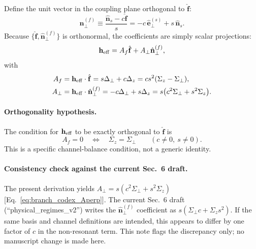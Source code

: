 Define the unit vector in the coupling plane orthogonal to $\hat{\mathbf f}$:
\begin{equation}
    \hat{\mathbf n}^{(f)}_\perp
    \equiv \frac{\hat{\mathbf n}_s - c\hat{\mathbf f}}{s}
    = -c\,\hat{\mathbf e}_{\perp}^{(s)} + s\,\hat{\mathbf n}_s.
\end{equation}
Because $\{\hat{\mathbf f},\hat{\mathbf n}^{(f)}_\perp\}$ is orthonormal, the
coefficients are simply scalar projections:
\begin{equation}
    \mathbf h_{\rm eff} = A_f \hat{\mathbf f} + A_\perp \hat{\mathbf n}^{(f)}_\perp,
\end{equation}
with
\begin{align}
    A_f &= \mathbf h_{\rm eff}\cdot\hat{\mathbf f}
        = s\Delta_\perp + c\Delta_z
        = c s^2 (\Sigma_z - \Sigma_\perp),
        \label{eq:branch_codex_Af}\\
    A_\perp &= \mathbf h_{\rm eff}\cdot\hat{\mathbf n}^{(f)}_\perp
        = -c\Delta_\perp + s\Delta_z
        = s\bigl(c^2\Sigma_\perp + s^2\Sigma_z\bigr).
        \label{eq:branch_codex_Aperp}
\end{align}

\paragraph{Orthogonality hypothesis.}
The condition for $\mathbf h_{\rm eff}$ to be exactly orthogonal to
$\hat{\mathbf f}$ is
\begin{equation}
    A_f = 0
    \quad\Longleftrightarrow\quad
    \Sigma_z = \Sigma_\perp
    \qquad (c\neq 0,\ s\neq 0).
    \label{eq:branch_codex_heff_orthogonal_condition}
\end{equation}
This is a specific channel-balance condition, not a generic identity.

\paragraph{Consistency check against the current Sec.~6 draft.}
The present derivation yields
$A_\perp = s(c^2\Sigma_\perp + s^2\Sigma_z)$
[Eq.~\eqref{eq:branch_codex_Aperp}].  The current Sec.~6 draft
(``physical\_regimes\_v2'') writes the $\hat{\mathbf n}_\perp^{(f)}$ coefficient
as $s(\Sigma_\perp c + \Sigma_z s^2)$.  If the same basis and channel
definitions are intended, this appears to differ by one factor of $c$ in the
non-resonant term.  This note flags the discrepancy only; no manuscript change
is made here.

